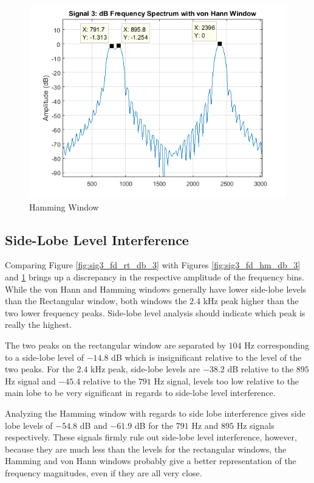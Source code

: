\documentclass[pdftex, 10pt]{IEEEtran}
\begin{document}
\begin{figure}
    \centering
    \includegraphics[scale=0.5]{sig3_fd_hn_db_3}
    \caption{Hamming Window}
    \label{fig:sig3_fd_hn_db_3}
\end{figure}

\subsection{Side-Lobe Level Interference}
Comparing Figure \ref{fig:sig3_fd_rt_db_3} with Figures \ref{fig:sig3_fd_hm_db_3} and 
\ref{fig:sig3_fd_hn_db_3} brings up a discrepancy in the respective amplitude of the 
frequency bins. While the von Hann and Hamming windows generally have lower side-lobe levels
than the Rectangular window, both windows the $2.4$ kHz peak higher than the two lower 
frequency peaks. Side-lobe level analysis should indicate which peak is really the highest.

The two peaks on the rectangular window are separated by $104$ Hz corresponding to a 
side-lobe level of $-14.8$ dB which is insignificant relative to the level of the two
peaks. For the $2.4$ kHz peak, side-lobe levels are $-38.2$ dB relative to the $895$ Hz
signal and $-45.4$ relative to the $791$ Hz signal, levels too low relative to the main 
lobe to be very significant in regards to side-lobe level interference.

Analyzing the Hamming window with regards to side lobe interference gives side lobe levels
of $-54.8$ dB and $-61.9$ dB for the $791$ Hz and $895$ Hz signals respectively. These
signals firmly rule out side-lobe level interference, however, because they are much less
than the levels for the rectangular windows, the Hamming and von Hann windows probably give
a better representation of the frequency magnitudes, even if they are all very close.
\end{document}

